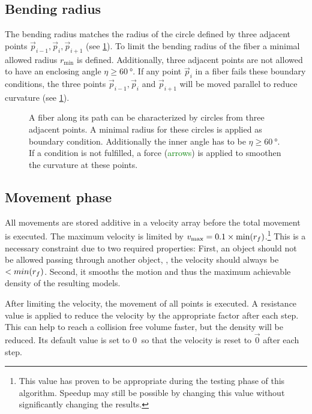 \subsection{Bending radius}
%
The bending radius matches the radius of the circle defined by three adjacent points $\vec{p}_{i-1}, \vec{p}_{i}, \vec{p}_{i+1}$ (see \cref{fig:modelCircle}).
To limit the bending radius of the fiber a minimal allowed radius $r_{\min}$ is defined.
Additionally, three adjacent points are not allowed to have an enclosing angle $\eta \geq \SI{60}{\degree}$.
If any point $\vec{p}_{i}$ in a fiber fails these boundary conditions, the three points $\vec{p}_{i-1}, \vec{p}_{i}$ and $\vec{p}_{i+1}$ will be moved parallel to reduce curvature (see \cref{fig:modelCircle}).
% 
\begin{figure}[!t]
    \centering
    \setlength{\tikzheight}{.75\textwidth}
	\caption[]{A fiber along its path can be characterized by circles from three adjacent points.
    A minimal radius for these circles is applied as boundary condition.
    Additionally the inner angle has to be $\eta \geq \SI{60}{\degree}$.
    If a condition is not fulfilled, a force (\textcolor{GREEN}{arrows}) is applied to smoothen the curvature at these points.}
	\label{fig:modelCircle}
\end{figure}
%
% 
% 
\subsection{Movement phase}
% 
All movements are stored additive in a velocity array before the total movement is executed.
The maximum velocity is limited by $v_{\max} = 0.1 \times \min(\mathit{\textnormal{$r_f$}})$.\footnote{This value has proven to be appropriate during the testing phase of this algorithm. Speedup may still be possible by changing this value without significantly changing the results.}
This is a necessary constraint due to two required properties:
First, an object should not be allowed passing through another object, \ie{}, the velocity should always be $<min(\textnormal{$r_f$})$.
Second, it smooths the motion and thus the maximum achievable density of the resulting models.
\par
% 
After limiting the velocity, the movement of all points is executed.
A resistance value is applied to reduce the velocity by the appropriate factor after each step.
This can help to reach a collision free volume faster, but the density will be reduced.
Its default value is set to $\SI{0}{}$ so that the velocity is reset to $\vec{0}$ after each step.
% 
% 
% 
